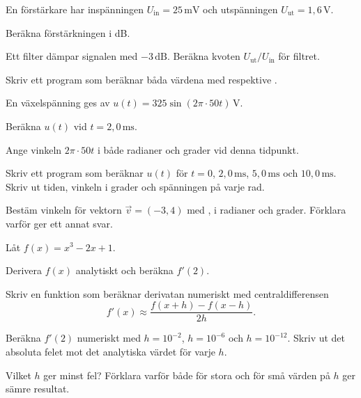 En förstärkare har inspänningen $U_{\text{in}} = 25\,\text{mV}$ och utspänningen
$U_{\text{ut}} = 1{,}6\,\text{V}$.
\begin{parts}
  \item Beräkna förstärkningen i dB.
  \item Ett filter dämpar signalen med $-3\,\text{dB}$. Beräkna kvoten
    $U_{\text{ut}}/U_{\text{in}}$ för filtret.
  \item Skriv ett program som beräknar båda värdena med  respektive .
\end{parts}

En växelspänning ges av $u(t) = 325\sin(2\pi \cdot 50t)\,\text{V}$.
\begin{parts}
  \item Beräkna $u(t)$ vid $t = 2{,}0\,\text{ms}$.
  \item Ange vinkeln $2\pi \cdot 50t$ i både radianer och grader vid denna tidpunkt.
  \item Skriv ett program som beräknar $u(t)$ för $t = 0$, $2{,}0\,\text{ms}$, $5{,}0\,\text{ms}$
    och $10{,}0\,\text{ms}$. Skriv ut tiden, vinkeln i grader och spänningen på varje rad.
  \item Bestäm vinkeln för vektorn $\vec{v} = (-3, 4)$ med , i radianer och grader.
    Förklara varför  ger ett annat svar.
\end{parts}


Låt $f(x) = x^3 - 2x + 1$.
\begin{parts}
  \item Derivera $f(x)$ analytiskt och beräkna $f'(2)$.
  \item Skriv en funktion  som beräknar derivatan numeriskt med
    centraldifferensen
    \[
      f'(x) \approx \frac{f(x + h) - f(x - h)}{2h}.
    \]
  \item Beräkna $f'(2)$ numeriskt med $h = 10^{-2}$, $h = 10^{-6}$ och $h = 10^{-12}$. Skriv ut
    det absoluta felet mot det analytiska värdet för varje $h$.
  \item Vilket $h$ ger minst fel? Förklara varför både för stora och för små värden på $h$ ger
    sämre resultat.
\end{parts}

